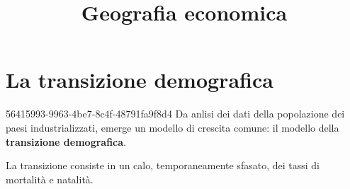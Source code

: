 \documentclass[preview]{standalone}
\begin{document}
\title{Geografia economica}
\genpage

\section{La transizione demografica}

\begin{snippet}{56415993-9963-4be7-8c4f-48791fa9f8d4}
    Da anlisi dei dati della popolazione dei paesi industrializzati,
    emerge un modello di crescita comune:
    il modello della \textbf{transizione demografica}.
    
    La transizione consiste in un calo, temporaneamente sfasato,
    dei tassi di mortalità e natalità.
\end{snippet}

\end{document}
